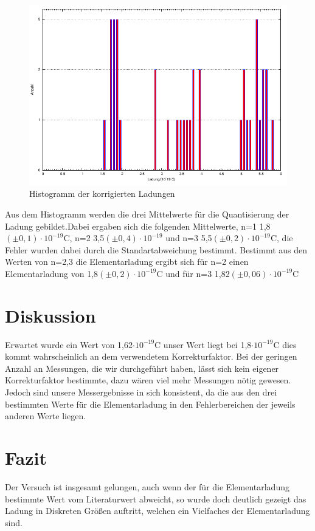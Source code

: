 \documentclass[12pt]{scrartcl}
\begin{document}
\begin{figure}[H] 
  \centering
    \includegraphics[scale = 0.7]{messung.pdf}
  	\caption[Histogramm der korrigierten Ladungen]{Histogramm der korrigierten Ladungen}
  \label{fig:histogramm}
\end{figure}

Aus dem Histogramm werden die drei Mittelwerte für die Quantisierung der Ladung gebildet.Dabei ergaben sich die folgenden Mittelwerte, n=1 \hspace*{4px} 1,8$(\pm0,1)\cdot 10^{-19}$C, n=2 \hspace*{4px} 3,5$(\pm 0,4)\cdot 10^{-19}$ und n=3 \hspace*{4px} 5,5$(\pm 0,2)\cdot 10^{-19}$C, die Fehler wurden dabei durch die Standartabweichung bestimmt. Bestimmt aus den Werten von n=2,3 die Elementarladung ergibt sich für n=2 einen Elementarladung von 1,8$(\pm 0,2)\cdot 10^{-19}$C und für n=3 \hspace*{4px} 1,82$(\pm 0,06)\cdot 10^{-19}$C

\section{Diskussion}
Erwartet wurde ein Wert von 1,62$\cdot 10^{-19}$C unser Wert liegt bei 1,8$\cdot 10^{-19}$C dies kommt wahrscheinlich an dem verwendetem Korrekturfaktor. Bei der geringen Anzahl an Messungen, die wir durchgeführt haben, lässt sich kein eigener Korrekturfaktor bestimmte, dazu wären viel mehr Messungen nötig gewesen. Jedoch sind unsere Messergebnisse in sich konsistent, da die aus den drei bestimmten Werte für die Elementarladung in den Fehlerbereichen der jeweils anderen Werte liegen.

\section{Fazit}
Der Versuch ist insgesamt gelungen, auch wenn der für die Elementarladung bestimmte Wert vom Literaturwert abweicht, so wurde doch deutlich gezeigt das Ladung in Diskreten Größen auftritt, welchen ein Vielfaches der Elementarladung sind.
\end{document}
